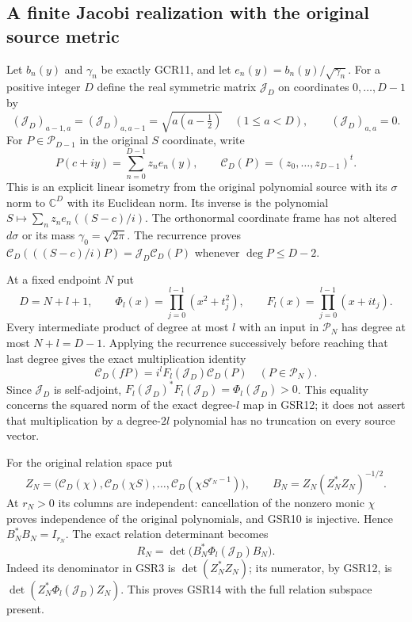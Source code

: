 \subsection{A finite Jacobi realization with the original source metric}

Let $b_n(y)$ and $\gamma_n$ be exactly GCR11, and let
$e_n(y)=b_n(y)/\sqrt{\gamma_n}$. For a positive integer $D$
define the real symmetric matrix $\mathcal J_D$ on coordinates
$0,\ldots,D-1$ by
\[
 (\mathcal J_D)_{a-1,a}=(\mathcal J_D)_{a,a-1}
       =\sqrt{a(a-\tfrac12)}\quad(1\leq a<D),
 \qquad(\mathcal J_D)_{a,a}=0.
\tag{GSR9}
\]
For $P\in\mathcal P_{D-1}$ in the original $S$ coordinate,
write
\[
 P(c+iy)=\sum_{n=0}^{D-1}z_n e_n(y),\qquad
 \mathcal C_D(P)=(z_0,\ldots,z_{D-1})^t .
\tag{GSR10}
\]
This is an explicit linear isometry from the original polynomial
source with its $\sigma$ norm to $\mathbb C^D$ with its Euclidean
norm. Its inverse is the polynomial
$S\mapsto\sum_nz_ne_n((S-c)/i)$. The orthonormal coordinate
frame has not altered $d\sigma$ or its mass $\gamma_0=\sqrt{2\pi}$.
The recurrence proves
$\mathcal C_D(((S-c)/i)P)=\mathcal J_D\mathcal C_D(P)$
whenever $\deg P\leq D-2$.

At a fixed endpoint $N$ put
\[
 D=N+l+1,\qquad
 \Phi_l(x)=\prod_{j=0}^{l-1}(x^2+t_j^2),\qquad
 F_l(x)=\prod_{j=0}^{l-1}(x+it_j).
\tag{GSR11}
\]
Every intermediate product of degree at most $l$ with an input
in $\mathcal P_N$ has degree at most $N+l=D-1$. Applying the
recurrence successively before reaching that last degree gives
the exact multiplication identity
\[
 \mathcal C_D(fP)=i^l F_l(\mathcal J_D)\mathcal C_D(P)
       \quad(P\in\mathcal P_N).
\tag{GSR12}
\]
Since $\mathcal J_D$ is self-adjoint,
$F_l(\mathcal J_D)^*F_l(\mathcal J_D)=\Phi_l(\mathcal J_D)>0$.
This equality concerns the squared norm of the exact degree-$l$
map in GSR12; it does not assert that multiplication by a
degree-$2l$ polynomial has no truncation on every source vector.

For the original relation space put
\[
 Z_N=
 \big(\mathcal C_D(\chi),\mathcal C_D(\chi S),\ldots,
                         \mathcal C_D(\chi S^{r_N-1})\big),\qquad
 B_N=Z_N(Z_N^*Z_N)^{-1/2}.
\tag{GSR13}
\]
At $r_N>0$ its columns are independent: cancellation of the
nonzero monic $\chi$ proves independence of the original
polynomials, and GSR10 is injective. Hence $B_N^*B_N=I_{r_N}$.
The exact relation determinant becomes
\[
 \boxed{\quad R_N=\det\bigl(B_N^*\Phi_l(\mathcal J_D)B_N\bigr).\quad}
\tag{GSR14}
\]
Indeed its denominator in GSR3 is $\det(Z_N^*Z_N)$; its
numerator, by GSR12, is
$\det(Z_N^*\Phi_l(\mathcal J_D)Z_N)$.
This proves GSR14 with the full relation subspace present.

